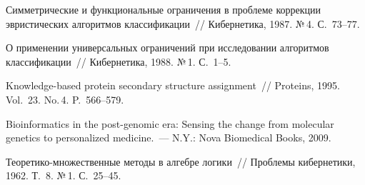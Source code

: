 \begin{multicols}{2}
{{\begin{thebibliography}{99}
Симметрические и функциональные ограничения в проблеме коррекции 
эвристических алгоритмов классификации~// Кибернетика, 1987. №\,4. 
С.~73--77.

О применении универсальных ограничений при исследовании алгоритмов 
классификации~// Кибернетика, 1988. №\,1. С.~1--5.

Knowledge-based protein secondary structure assignment~// Proteins, 1995. Vol.~23. 
No.\,4. P.~566--579.

Bioinformatics in the post-genomic era: Sensing the change from molecular genetics 
to personalized medicine.~--- N.Y.: Nova Biomedical Books, 2009. 

  \label{end\stat}

Теоретико-множественные методы в алгебре логики~//  Проблемы 
кибернетики, 1962. Т.~8. №\,1. С.~25--45.

 \end{thebibliography}
}
}

\end{multicols}